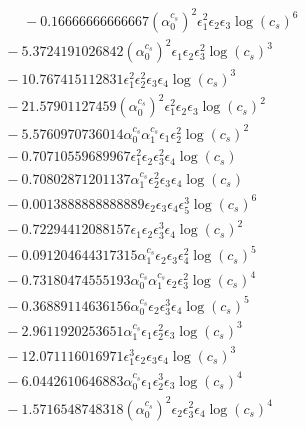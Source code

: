 \documentclass[10pt]{article}
\begin{document}
\begin{align*}
\phantom{F_{s,6}} &\phantom{={}}{}  - 0.16666666666667 \left(\alpha_{0}^{c_s}\right)^{2} \epsilon_{1}^{2} \epsilon_{2} \epsilon_{3} \log{\left(c_{s} \right)}^{6} \\
&{}  - 5.3724191026842 \left(\alpha_{0}^{c_s}\right)^{2} \epsilon_{1} \epsilon_{2} \epsilon_{3}^{2} \log{\left(c_{s} \right)}^{3} \\
&{}  - 10.767415112831 \epsilon_{1}^{2} \epsilon_{2}^{2} \epsilon_{3} \epsilon_{4} \log{\left(c_{s} \right)}^{3} \\
&{}  - 21.57901127459 \left(\alpha_{0}^{c_s}\right)^{2} \epsilon_{1}^{2} \epsilon_{2} \epsilon_{3} \log{\left(c_{s} \right)}^{2} \\
&{}  - 5.5760970736014 \alpha_{0}^{c_s} \alpha_{1}^{c_s} \epsilon_{1} \epsilon_{2}^{2} \log{\left(c_{s} \right)}^{2} \\
&{}  - 0.70710559689967 \epsilon_{1}^{2} \epsilon_{2} \epsilon_{3}^{2} \epsilon_{4} \log{\left(c_{s} \right)} \\
&{}  - 0.70802871201137 \alpha_{1}^{c_s} \epsilon_{2}^{2} \epsilon_{3} \epsilon_{4} \log{\left(c_{s} \right)} \\
&{}  - 0.0013888888888889 \epsilon_{2} \epsilon_{3} \epsilon_{4} \epsilon_{5}^{3} \log{\left(c_{s} \right)}^{6} \\
&{}  - 0.72294412088157 \epsilon_{1} \epsilon_{2} \epsilon_{3}^{3} \epsilon_{4} \log{\left(c_{s} \right)}^{2} \\
&{}  - 0.091204644317315 \alpha_{1}^{c_s} \epsilon_{2} \epsilon_{3} \epsilon_{4}^{2} \log{\left(c_{s} \right)}^{5} \\
&{}  - 0.73180474555193 \alpha_{0}^{c_s} \alpha_{1}^{c_s} \epsilon_{2} \epsilon_{3}^{2} \log{\left(c_{s} \right)}^{4} \\
&{}  - 0.36889114636156 \alpha_{0}^{c_s} \epsilon_{2} \epsilon_{3}^{3} \epsilon_{4} \log{\left(c_{s} \right)}^{5} \\
&{}  - 2.9611920253651 \alpha_{1}^{c_s} \epsilon_{1} \epsilon_{2}^{2} \epsilon_{3} \log{\left(c_{s} \right)}^{3} \\
&{}  - 12.071116016971 \epsilon_{1}^{3} \epsilon_{2} \epsilon_{3} \epsilon_{4} \log{\left(c_{s} \right)}^{3} \\
&{}  - 6.0442610646883 \alpha_{0}^{c_s} \epsilon_{1} \epsilon_{2}^{3} \epsilon_{3} \log{\left(c_{s} \right)}^{4} \\
&{}  - 1.5716548748318 \left(\alpha_{0}^{c_s}\right)^{2} \epsilon_{2} \epsilon_{3}^{2} \epsilon_{4} \log{\left(c_{s} \right)}^{4} \\

\end{align*}
\end{document}
